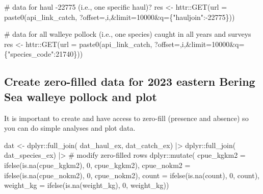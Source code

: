 \documentclass[
  letterpaper,
  oneside,
  open=any]{scrbook}
\newenvironment{Shaded}{\begin{snugshade}}{\end{snugshade}}
\newcommand{\AttributeTok}[1]{\textcolor[rgb]{0.40,0.45,0.13}{#1}}
\newcommand{\CommentTok}[1]{\textcolor[rgb]{0.37,0.37,0.37}{#1}}
\newcommand{\DecValTok}[1]{\textcolor[rgb]{0.68,0.00,0.00}{#1}}
\newcommand{\FunctionTok}[1]{\textcolor[rgb]{0.28,0.35,0.67}{#1}}
\newcommand{\NormalTok}[1]{\textcolor[rgb]{0.00,0.23,0.31}{#1}}
\newcommand{\OtherTok}[1]{\textcolor[rgb]{0.00,0.23,0.31}{#1}}
\newcommand{\SpecialCharTok}[1]{\textcolor[rgb]{0.37,0.37,0.37}{#1}}
\newcommand{\StringTok}[1]{\textcolor[rgb]{0.13,0.47,0.30}{#1}}
\begin{document}
\begin{Shaded}
\begin{Highlighting}[]
\CommentTok{\# data for haul {-}22775 (i.e., one specific haul)?}
\NormalTok{res }\OtherTok{\textless{}{-}}\NormalTok{ httr}\SpecialCharTok{::}\FunctionTok{GET}\NormalTok{(}\AttributeTok{url =} \FunctionTok{paste0}\NormalTok{(api\_link\_catch, }
                              \StringTok{\textquotesingle{}?offset=\textquotesingle{}}\NormalTok{,i,}\StringTok{\textquotesingle{}\&limit=10000\&q=\{"hauljoin":{-}22775\}\textquotesingle{}}\NormalTok{))}

\CommentTok{\# data for all walleye pollock (i.e., one species) caught in all years and surveys}
\NormalTok{res }\OtherTok{\textless{}{-}}\NormalTok{ httr}\SpecialCharTok{::}\FunctionTok{GET}\NormalTok{(}\AttributeTok{url =} \FunctionTok{paste0}\NormalTok{(api\_link\_catch, }
                              \StringTok{\textquotesingle{}?offset=\textquotesingle{}}\NormalTok{,i,}\StringTok{\textquotesingle{}\&limit=10000\&q=\{"species\_code":21740\}\textquotesingle{}}\NormalTok{))}
\end{Highlighting}
\end{Shaded}

\subsection{Create zero-filled data for 2023 eastern Bering Sea walleye
pollock and
plot}\label{create-zero-filled-data-for-2023-eastern-bering-sea-walleye-pollock-and-plot}

It is important to create and have access to zero-fill (presence and
absence) so you can do simple analyses and plot data.

\begin{Shaded}
\begin{Highlighting}[]
\NormalTok{dat }\OtherTok{\textless{}{-}}\NormalTok{ dplyr}\SpecialCharTok{::}\FunctionTok{full\_join}\NormalTok{(}
\NormalTok{  dat\_haul\_ex,}
\NormalTok{  dat\_catch\_ex) }\SpecialCharTok{|\textgreater{}} 
\NormalTok{  dplyr}\SpecialCharTok{::}\FunctionTok{full\_join}\NormalTok{(}
\NormalTok{    dat\_species\_ex)  }\SpecialCharTok{|\textgreater{}} 
  \CommentTok{\# modify zero{-}filled rows}
\NormalTok{  dplyr}\SpecialCharTok{::}\FunctionTok{mutate}\NormalTok{(}
    \AttributeTok{cpue\_kgkm2 =} \FunctionTok{ifelse}\NormalTok{(}\FunctionTok{is.na}\NormalTok{(cpue\_kgkm2), }\DecValTok{0}\NormalTok{, cpue\_kgkm2),}
    \AttributeTok{cpue\_nokm2 =} \FunctionTok{ifelse}\NormalTok{(}\FunctionTok{is.na}\NormalTok{(cpue\_nokm2), }\DecValTok{0}\NormalTok{, cpue\_nokm2),}
    \AttributeTok{count =} \FunctionTok{ifelse}\NormalTok{(}\FunctionTok{is.na}\NormalTok{(count), }\DecValTok{0}\NormalTok{, count),}
    \AttributeTok{weight\_kg =} \FunctionTok{ifelse}\NormalTok{(}\FunctionTok{is.na}\NormalTok{(weight\_kg), }\DecValTok{0}\NormalTok{, weight\_kg))}
\end{Highlighting}
\end{Shaded}
\end{document}
